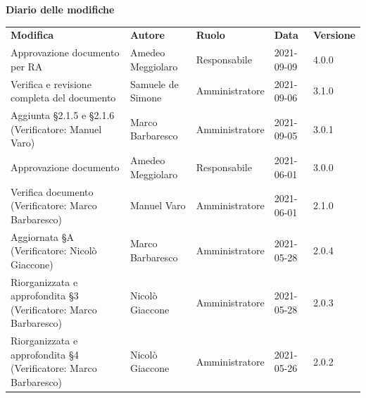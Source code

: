 \documentclass[a4paper]{article}
\begin{document}
\begin{center}
    \centering
    \textbf{\Large Diario delle modifiche}\\
    \vspace{10px}
    \renewcommand{\arraystretch}{1.8}
    \label{tab:Diario delle modifiche}
    \begin{longtable}[!h]{p{160px} p{80px} p{70px} p{55px} p{40px}}
        \rowcolor{logo!70} \textbf{Modifica}                                       & \textbf{Autore}                             & \textbf{Ruolo} & \textbf{Data} & \textbf{Versione} \\
        Approvazione documento per RA                                              & Amedeo Meggiolaro                           & Responsabile   & 2021-09-09    & 4.0.0             \\
        Verifica e revisione completa del documento                                & Samuele de Simone                           & Amministratore & 2021-09-06    & 3.1.0             \\
        Aggiunta \S 2.1.5 e \S 2.1.6 \newline (Verificatore: Manuel Varo)          & Marco Barbaresco                            & Amministratore & 2021-09-05    & 3.0.1             \\
        Approvazione documento                                                     & Amedeo Meggiolaro                           & Responsabile   & 2021-06-01    & 3.0.0             \\
        Verifica documento \newline (Verificatore: Marco Barbaresco)               & Manuel Varo                                 & Amministratore & 2021-06-01    & 2.1.0             \\
        Aggiornata \S A \newline (Verificatore: Nicolò Giaccone)                   & Marco Barbaresco                            & Amministratore & 2021-05-28    & 2.0.4             \\
        Riorganizzata e approfondita \S3 \newline (Verificatore: Marco Barbaresco) & Nicolò Giaccone                             & Amministratore & 2021-05-28    & 2.0.3             \\
        Riorganizzata e approfondita \S4 \newline (Verificatore: Marco Barbaresco) & Nicolò Giaccone                             & Amministratore & 2021-05-26    & 2.0.2             \\

\end{longtable}
\end{center}
\end{document}
